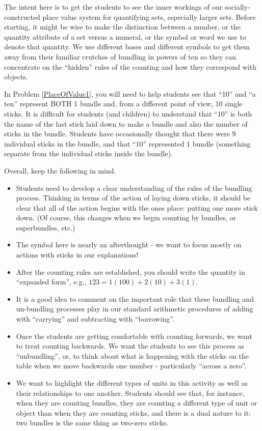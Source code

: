\documentclass{ximera}
\begin{document}
\newpage
\begin{instructorNotes}
The intent here is to get the students to see the inner workings of our socially-constructed place value system for quantifying sets, especially larger sets.  Before starting, it might be wise to make the distinction between a number, or the quantity attribute of a set versus a numeral, or the symbol or word we use to denote that quantity. We use different bases and different symbols to get them away from their familiar crutches of bundling in powers of ten so they can concentrate on the ``hidden'' rules of the counting and how they correspond with objects.

In Problem \ref{PlaceOfValue1}, you will need to help students see that ``10'' and ``a ten'' represent BOTH 1 bundle and, from a different point of view, 10 single sticks.  It is difficult for students (and children) to understand that ``10'' is both the name of the last stick laid down to make a bundle and also the number of sticks in the bundle.  Students have occasionally thought that there were 9 individual sticks in the bundle, and that ``10'' represented 1 bundle (something separate from the individual sticks inside the bundle).

Overall, keep the following in mind.
\begin{itemize}
	\item Students need to develop a clear understanding of the rules of the bundling process. Thinking in terms of the action of laying down sticks, it should be clear that all of the action begins with the ones place:  putting one more stick down. (Of course, this changes when we begin counting by bundles, or superbundles, etc.)
	\item The symbol here is nearly an afterthought - we want to focus mostly on actions with sticks in our explanations!
	\item After the counting rules are established, you should write the quantity in ``expanded form'', e.g., $123 = 1(100) + 2(10) + 3(1)$.
	\item It is a good idea to comment on the important role that these bundling and un-bundling processes play in our standard arithmetic procedures of adding with ``carrying'' and subtracting with ``borrowing''. 
	\item Once the students are getting comfortable with counting forwards, we want to treat counting backwards.  We want the students to see this process as ``unbundling'', or, to think about what is happening with the sticks on the table when we move backwards one number - particularly ``across a zero''. 
	\item We want to highlight the different types of units in this activity as well as their relationships to one another.  Students should see that, for instance, when they are counting bundles, they are counting a different type of unit or object than when they are counting sticks, and there is a dual nature to it: two bundles is the same thing as two-zero sticks.
\end{itemize}


\end{instructorNotes}
\end{document}
